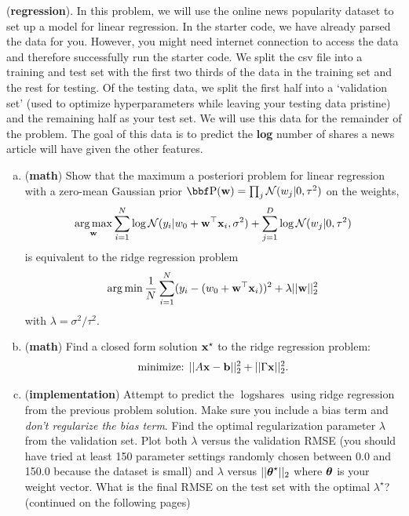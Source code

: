 \documentclass[12pt,letterpaper]{hmcpset}
\begin{document}
\begin{problem}[3]
(\textbf{regression}). In this problem, we will use the online news popularity dataset to set up a model for linear regression. In the starter code, we have already parsed the data for you. However, you might need internet connection to access the data and therefore successfully run the starter code.
\newline \newline
We split the csv file into a training and test set with
the first two thirds of the data in the training set and the rest for testing.
Of the testing data, we split the first half into a `validation set' (used
to optimize hyperparameters while leaving your testing data pristine) and
the remaining half as your test set.
We will use this data for the remainder of the problem. The goal of this data
is to predict the \textbf{log} number of shares a news article will have given the other
features.
\newline \newline
\begin{enumerate}[(a)]
	\item (\textbf{math}) Show that the maximum a posteriori problem for
	linear regression with a zero-mean Gaussian prior $\PP(\ww) = \prod_j
	\Nc(w_j | 0, \tau^2)$ on the weights,
	\[
	\operatorname*{arg\,max}_{\bf w} \sum_{i=1}^N \log{\cal N}(y_i | w_0 + {\bf w}^\top{\bf x}_i, \sigma^2) + \sum_{j=1}^D \log{\cal N}(w_j | 0, \tau^2)
	\]
	is equivalent to the ridge regression problem
	\[
	\operatorname*{arg\,min} \frac{1}{N}\sum_{i=1}^N (y_i - (w_0 + {\bf w}^\top{\bf x}_i))^2 + \lambda ||{\bf w}||_2^2
	\]
	with $\lambda = \sigma^2 / \tau^2$.
	\newline
	\item (\textbf{math}) Find a closed form solution ${\bf x}^\star$ to the ridge regression
	problem:
	\[
	\text{minimize: } ||A{\bf x} - {\bf b}||_2^2 + ||\Gamma{\bf x}||_2^2.
	\]
	
	\item
	(\textbf{implementation}) Attempt to predict the $\log\text{shares}$ using ridge
regression from the previous problem solution. Make sure you include a bias
term and \textit{don't regularize the bias term}.
Find the optimal regularization parameter $\lambda$
from the validation set. Plot both $\lambda$ versus the validation RMSE (you should have
tried at least 150 parameter settings randomly chosen between 0.0 and 150.0 because
the dataset is small)
and $\lambda$ versus $||\hbox{\boldmath$\theta$}^\star||_2$ where $\hbox{\boldmath$\theta$}$ is your weight vector.
What is the final RMSE on the test set with the optimal $\lambda^\star$?\\
\newline
(continued on the following pages)
\end{enumerate}
\end{problem}
\end{document}
